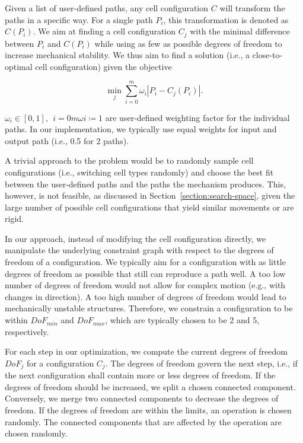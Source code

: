Given a list of user-defined paths, any cell configuration $C$ will transform the paths in a specific way. For a single path $P_i$, this transformation is denoted as $C\left(P_i\right)$. We aim at finding a cell configuration $C_j$ with the minimal difference between $P_i$ and $C\left(P_i\right)$ while using as few as possible degrees of freedom to increase mechanical stability. We thus aim to find a solution (i.e., a close-to-optimal cell configuration) given the objective

$$\min_j{\sum_{i=0}^{m}{\omega_i \left| P_i-C_j \left( P_i \right) \right|.}}$$

$\omega_i\in\left[0,1\right],\ \ i=0mωi≔1$ are user-defined weighting factor for the individual paths. In our implementation, we typically use equal weights for input and output path (i.e., 0.5 for 2 paths).

A trivial approach to the problem would be to randomly sample cell configurations (i.e., switching cell types randomly) and choose the best fit between the user-defined paths and the paths the mechanism produces. This, however, is not feasible, as discussed in Section~\ref{section:search-space}, given the large number of possible cell configurations that yield similar movements or are rigid. 

In our approach, instead of modifying the cell configuration directly, we manipulate the underlying constraint graph with respect to the degrees of freedom of a configuration. We typically aim for a configuration with as little degrees of freedom as possible that still can reproduce a path well. A too low number of degrees of freedom would not allow for complex motion (e.g., with changes in direction). A too high number of degrees of freedom would lead to mechanically unstable structures. Therefore, we constrain a configuration to be within ${DoF}_{min}$ and ${DoF}_{max}$, which are typically chosen to be 2 and 5, respectively. 

For each step in our optimization, we compute the current degrees of freedom ${DoF}_j$ for a configuration $C_j$. The degrees of freedom govern the next step, i.e., if the next configuration shall contain more or less degrees of freedom. If the degrees of freedom should be increased, we split a chosen connected component. Conversely, we merge two connected components to decrease the degrees of freedom. If the degrees of freedom are within the limits, an operation is chosen randomly. The connected components that are affected by the operation are chosen randomly. 

